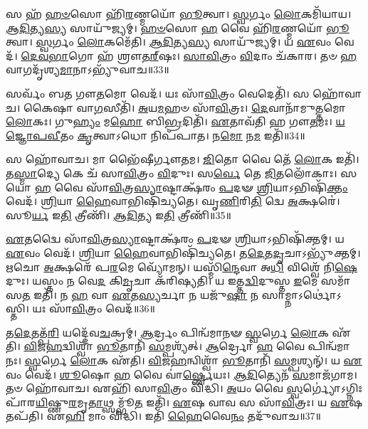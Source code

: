    𑌸 𑌹᳴ \ul{𑌹}\-\-\ul{𑍞}\-𑌸𑍋 𑌹𑌿᳴\-\ul{𑌰}\-𑌣𑍍𑌮𑌯𑍋᳴ \ul{𑌭𑍂}\-𑌤𑍍𑌵𑌾।
   \ul{𑌸𑍍𑌵}\-𑌰𑍍𑌗𑌂 \ul{𑌲𑍋}\-𑌕𑌮𑌿᳴𑌯𑌾𑌯।
   \ul{𑌆}\-\-\ul{𑌦𑌿}\-𑌤𑍍𑌯\-\ul{𑌸𑍍𑌯} 𑌸𑌾𑌯𑍁᳴𑌜𑍍𑌯𑌮𑍍।
   \ul{𑌹}\-\-\ul{𑍞}\-𑌸𑍋 \ul{𑌹} 𑌵𑍈 𑌹𑌿᳴\-\ul{𑌰}\-𑌣𑍍𑌮𑌯𑍋᳴ \ul{𑌭𑍂}\-𑌤𑍍𑌵𑌾।
   \ul{𑌸𑍍𑌵}\-𑌰𑍍𑌗𑌂 \ul{𑌲𑍋}\-𑌕𑌮𑍇᳴𑌤𑌿।
   \ul{𑌆}\-\-\ul{𑌦𑌿}\-𑌤𑍍𑌯\-\ul{𑌸𑍍𑌯} 𑌸𑌾𑌯𑍁᳴𑌜𑍍𑌯𑌮𑍍।
   𑌯 \ul{𑌏}\-𑌵𑌂 𑌵𑍇𑌦᳴।
   \ul{𑌦𑍇}\-\-\ul{𑌵}\-\-\ul{𑌭𑌾}\-𑌗𑍋 𑌹᳴ 𑌶𑍍𑌰𑍗\-\ul{𑌤}\-\ul{𑌰𑍍}‌𑌷𑌃।
   \ul{𑌸𑌾}\-\-\ul{𑌵𑌿}\-𑌤𑍍𑌰𑌂 \ul{𑌵𑌿}\-𑌦𑌾𑌂 𑌚᳴𑌕𑌾𑌰।
   𑌤𑍞 \ul{𑌹} 𑌵𑌾𑌗𑌦𑍃᳴𑌶𑍍𑌯\-\ul{𑌮𑌾}\-𑌨𑌾𑌽𑌭𑍍𑌯𑍁᳴𑌵𑌾𑌚॥33॥

   𑌸𑌰𑍍𑌵𑌂᳴ 𑌬𑌤 𑌗𑍗\-\ul{𑌤}\-𑌮𑍋 𑌵𑍇𑌦᳴।
   𑌯𑌃 𑌸𑌾᳴\-\ul{𑌵𑌿}\-𑌤𑍍𑌰𑌂 𑌵𑍇𑌦𑍇𑌤𑌿᳴।
   𑌸 𑌹𑍋᳴𑌵𑌾𑌚।
   𑌕𑍈𑌷𑌾 𑌵𑌾\-\ul{𑌗}\-𑌸𑍀𑌤𑌿᳴।
   \ul{𑌅}\-𑌯\-\ul{𑌮}\-𑌹𑍞 𑌸𑌾᳴\-\ul{𑌵𑌿}\-𑌤𑍍𑌰𑌃।
   \ul{𑌦𑍇}\-𑌵𑌾𑌨𑌾᳴𑌮𑍁\-\ul{𑌤𑍍𑌤}\-𑌮𑍋 \ul{𑌲𑍋}\-𑌕𑌃।
   𑌗𑍁\-\ul{𑌹𑍍𑌯𑌂} 𑌮\-\ul{𑌹𑍋} 𑌬𑌿\-\ul{𑌭𑍍𑌰}\-𑌦𑌿𑌤𑌿᳴।
   \ul{𑌏}\-𑌤𑌾𑌵᳴𑌤𑌿 𑌹 𑌗𑍗\-\ul{𑌤}\-𑌮𑌃।
   \ul{𑌯}\-\-\ul{𑌜𑍍𑌞𑍋}\-\-\ul{𑌪}\-\-\ul{𑌵𑍀}\-𑌤𑌂 \ul{𑌕𑍃}\-𑌤𑍍𑌵𑌾𑌽𑌧𑍋 𑌨𑌿𑌪᳴𑌪𑌾𑌤।
   𑌨\-\ul{𑌮𑍋} 𑌨\-\ul{𑌮} 𑌇𑌤𑌿᳴॥34॥

   𑌸 𑌹𑍋᳴𑌵𑌾𑌚।
   𑌮𑌾 𑌭𑍈᳴𑌷𑍀𑌰𑍍𑌗𑍗𑌤𑌮।
   \ul{𑌜𑌿}\-𑌤𑍋 𑌵𑍈 𑌤𑍇᳴ \ul{𑌲𑍋}\-𑌕 𑌇𑌤𑌿᳴।
   𑌤\-\ul{𑌸𑍍𑌮𑌾}\-𑌦𑍍𑌯𑍇 𑌕𑍇 𑌚᳴ 𑌸𑌾\-\ul{𑌵𑌿}\-𑌤𑍍𑌰𑌂 \ul{𑌵𑌿}\-𑌦𑍁𑌃।
   𑌸\-\ul{𑌰𑍍𑌵𑍇} 𑌤𑍇 \ul{𑌜𑌿}\-𑌤𑌲𑍋᳴𑌕𑌾𑌃।
   𑌸 𑌯𑍋 \ul{𑌹} 𑌵𑍈 𑌸𑌾᳴\-\ul{𑌵𑌿}\-𑌤𑍍𑌰\-\ul{𑌸𑍍𑌯𑌾}\-𑌷𑍍𑌟𑌾𑌕𑍍𑌷᳴𑌰𑌂 \ul{𑌪}\-𑌦𑍟 \ul{𑌶𑍍𑌰𑌿}\-𑌯𑌾𑌽𑌭𑌿𑌷𑌿᳴\-\ul{𑌕𑍍𑌤𑌂} 𑌵𑍇𑌦᳴।
   \ul{𑌶𑍍𑌰𑌿}\-𑌯𑌾 \ul{𑌹𑍈}\-𑌵𑌾𑌭𑌿𑌷𑌿᳴𑌚𑍍𑌯𑌤𑍇।
   𑌘𑍃\-\ul{𑌣𑌿}\-𑌰𑌿\-\ul{𑌤𑌿} 𑌦𑍍𑌵𑍇 \ul{𑌅}\-𑌕𑍍𑌷𑌰𑍇॑।
   𑌸𑍂\-\ul{𑌰𑍍𑌯} 𑌇\-\ul{𑌤𑌿} 𑌤𑍍𑌰𑍀𑌣𑌿᳴।
   \ul{𑌆}\-\-\ul{𑌦𑌿}\-𑌤𑍍𑌯 𑌇\-\ul{𑌤𑌿} 𑌤𑍍𑌰𑍀𑌣𑌿᳴॥35॥

   \ul{𑌏}\-𑌤𑌦𑍍𑌵𑍈 𑌸𑌾᳴\-\ul{𑌵𑌿}\-𑌤𑍍𑌰\-\ul{𑌸𑍍𑌯𑌾}\-𑌷𑍍𑌟𑌾𑌕𑍍𑌷᳴𑌰𑌂 \ul{𑌪}\-𑌦𑍟 \ul{𑌶𑍍𑌰𑌿}\-𑌯𑌾𑌽𑌭𑌿𑌷𑌿᳴𑌕𑍍𑌤𑌮𑍍।
   𑌯 \ul{𑌏}\-𑌵𑌂 𑌵𑍇𑌦᳴।
   \ul{𑌶𑍍𑌰𑌿}\-𑌯𑌾 \ul{𑌹𑍈}\-𑌵𑌾𑌭𑌿𑌷𑌿᳴𑌚𑍍𑌯𑌤𑍇।
   𑌤\-\ul{𑌦𑍇}\-𑌤\-\ul{𑌦𑍃}\-𑌚𑌾𑌽𑌭𑍍𑌯𑍁᳴𑌕𑍍𑌤𑌮𑍍।
   \ul{𑌋}\-𑌚𑍋 \ul{𑌅}\-𑌕𑍍𑌷𑌰𑍇᳴ 𑌪\-\ul{𑌰}\-𑌮𑍇 𑌵𑍍𑌯𑍋᳴𑌮𑌨𑍍।
   𑌯𑌸𑍍𑌮𑌿᳴\-\ul{𑌨𑍍𑌦𑍇}\-𑌵𑌾 𑌅\-\ul{𑌧𑌿} 𑌵𑌿𑌶𑍍𑌵𑍇᳴ 𑌨𑌿\-\ul{𑌷𑍇}\-𑌦𑍁𑌃।
   𑌯𑌸𑍍𑌤𑌂 𑌨 𑌵𑍇\-\ul{𑌦} 𑌕𑌿\-\ul{𑌮𑍃}\-𑌚𑌾 𑌕᳴𑌰𑌿𑌷𑍍𑌯𑌤𑌿।
   𑌯 𑌇𑌤𑍍𑌤\-\ul{𑌦𑍍𑌵𑌿}\-𑌦𑍁𑌸𑍍𑌤 \ul{𑌇}\-𑌮𑍇 𑌸𑌮𑌾᳴𑌸\-\ul{𑌤} 𑌇𑌤𑌿᳴।
   𑌨 \ul{𑌹} 𑌵𑌾 \ul{𑌏}\-𑌤\-\ul{𑌸𑍍𑌯}\-𑌰𑍍𑌚𑌾 𑌨 𑌯𑌜𑍁᳴\-\ul{𑌷𑌾} 𑌨 𑌸𑌾𑌮𑍍𑌨𑌾𑌽𑌰𑍍𑌥𑍋॑𑌽𑌸𑍍𑌤𑌿।
   𑌯𑌃 𑌸𑌾᳴\-\ul{𑌵𑌿}\-𑌤𑍍𑌰𑌂 𑌵𑍇𑌦᳴॥36॥

   𑌤\-\ul{𑌦𑍇}\-𑌤𑌤𑍍𑌪᳴\-\ul{𑌰𑌿} 𑌯𑌦𑍍𑌦𑍇᳴𑌵\-\ul{𑌚}\-𑌕𑍍𑌰𑌮𑍍।
   \ul{𑌆}\-𑌰𑍍𑌦𑍍𑌰𑌂 𑌪𑌿𑌨𑍍𑌵᳴𑌮𑌾𑌨𑍟 \ul{𑌸𑍍𑌵}\-𑌰𑍍𑌗𑍇 \ul{𑌲𑍋}\-𑌕 𑌏᳴𑌤𑌿।
   \ul{𑌵𑌿}\-𑌜\-\ul{𑌹}\-𑌦𑍍𑌵𑌿𑌶𑍍𑌵𑌾᳴ \ul{𑌭𑍂}\-𑌤𑌾𑌨𑌿᳴ \ul{𑌸}\-𑌮𑍍𑌪𑌶𑍍𑌯᳴𑌤𑍍।
   \ul{𑌆}\-𑌰𑍍𑌦𑍍𑌰𑍋 \ul{𑌹} 𑌵𑍈 𑌪𑌿𑌨𑍍𑌵᳴𑌮𑌾𑌨𑌃।
   \ul{𑌸𑍍𑌵}\-𑌰𑍍𑌗𑍇 \ul{𑌲𑍋}\-𑌕 𑌏᳴𑌤𑌿।
   \ul{𑌵𑌿}\-𑌜\-\ul{𑌹}\-𑌨𑍍𑌵𑌿𑌶𑍍𑌵𑌾᳴ \ul{𑌭𑍂}\-𑌤𑌾𑌨𑌿᳴ \ul{𑌸}\-𑌮𑍍𑌪𑌶𑍍𑌯𑌨𑍍᳴।
   𑌯 \ul{𑌏}\-𑌵𑌂 𑌵𑍇𑌦᳴।
   \ul{𑌶𑍂}\-𑌷𑍋 \ul{𑌹} 𑌵𑍈 𑌵𑌾॑\-\ul{𑌰𑍍𑌷𑍍𑌣𑍇}\-𑌯𑌃।
   \ul{𑌆}\-\-\ul{𑌦𑌿}\-𑌤𑍍𑌯𑍇𑌨᳴ \ul{𑌸}\-𑌮𑌾𑌜᳴𑌗𑌾𑌮।
   𑌤𑍞 𑌹𑍋᳴𑌵𑌾𑌚।
   𑌏𑌹𑌿᳴ 𑌸𑌾\-\ul{𑌵𑌿}\-𑌤𑍍𑌰𑌂 𑌵𑌿᳴𑌦𑍍𑌧𑌿।
   \ul{𑌅}\-𑌯𑌂 𑌵𑍈 \ul{𑌸𑍍𑌵}\-𑌰𑍍𑌗𑍍𑌯𑍋॑𑌽𑌗𑍍𑌨𑌿𑌃 𑌪𑌾᳴𑌰\-\ul{𑌯𑌿}\-𑌷𑍍𑌣𑍁\-\ul{𑌰}\-𑌮𑍃\-\ul{𑌤𑌾}\-𑌥𑍍𑌸𑌮𑍍𑌭𑍂᳴\-\ul{𑌤} 𑌇𑌤𑌿᳴।
   \ul{𑌏}\-𑌷 𑌵𑌾𑌵 𑌸 𑌸𑌾᳴\-\ul{𑌵𑌿}\-𑌤𑍍𑌰𑌃।
   𑌯 \ul{𑌏}\-𑌷 𑌤𑌪᳴𑌤𑌿।
   𑌏\-\ul{𑌹𑌿} 𑌮𑌾𑌂 𑌵𑌿᳴𑌦𑍍𑌧𑌿।
   𑌇𑌤𑌿᳴ \ul{𑌹𑍈}\-𑌵𑍈\-\ul{𑌨𑌂} 𑌤𑌦𑍁᳴𑌵𑌾𑌚॥37॥
   \anuvakamend

